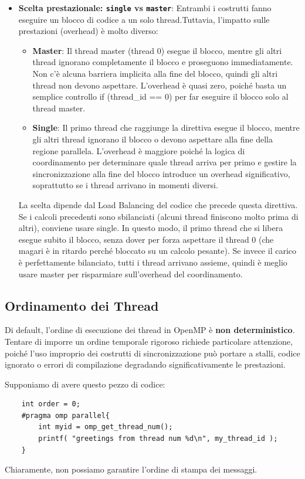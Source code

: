 \begin{itemize}
    \item \textbf{Scelta prestazionale: \texttt{single} vs \texttt{master}}: Entrambi i costrutti fanno eseguire un blocco di codice a un solo thread.Tuttavia, l'impatto sulle prestazioni (overhead) è molto diverso:
    \begin{itemize}
        \item \textbf{Master}: Il thread master (thread 0) esegue il blocco, mentre gli altri thread ignorano completamente il blocco e proseguono immediatamente. Non c'è alcuna barriera implicita alla fine del blocco, quindi gli altri thread non devono aspettare. L'overhead è quasi zero, poiché basta un semplice controllo if (thread\_id == 0) per far eseguire il blocco solo al thread master.
        \item \textbf{Single}: Il primo thread che raggiunge la direttiva esegue il blocco, mentre gli altri thread ignorano il blocco o devono aspettare alla fine della regione parallela. L'overhead è maggiore poiché la logica di coordinamento per determinare quale thread arriva per primo e gestire la sincronizzazione alla fine del blocco introduce un overhead significativo, soprattutto se i thread arrivano in momenti diversi.
    \end{itemize}
    La scelta dipende dal Load Balancing del codice che precede questa direttiva. Se i calcoli precedenti sono sbilanciati (alcuni thread finiscono molto prima di altri), conviene usare single. In questo modo, il primo thread che si libera esegue subito il blocco, senza dover per forza aspettare il thread 0 (che magari è in ritardo perché bloccato su un calcolo pesante). Se invece il carico è perfettamente bilanciato, tutti i thread arrivano assieme, quindi è meglio usare master per risparmiare sull'overhead del coordinamento.
\end{itemize}

\subsection{Ordinamento dei Thread}
Di default, l'ordine di esecuzione dei thread in OpenMP è \textbf{non deterministico}. Tentare di imporre un ordine temporale rigoroso richiede particolare attenzione, poiché l'uso improprio dei costrutti di sincronizzazione può portare a stalli, codice ignorato o errori di compilazione degradando significativamente le prestazioni.

Supponiamo di avere questo pezzo di codice:
\begin{verbatim}
    int order = 0;
    #pragma omp parallel{
        int myid = omp_get_thread_num();
        printf( "greetings from thread num %d\n", my_thread_id );
    }
\end{verbatim}
Chiaramente, non possiamo garantire l'ordine di stampa dei messaggi. 
